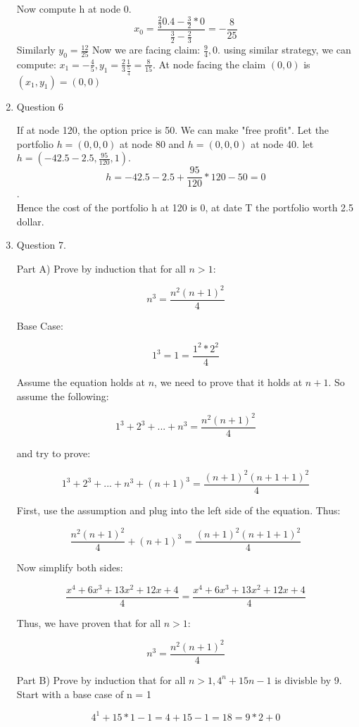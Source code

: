 \documentclass[]{book}
\theoremstyle{definition}
\begin{document}
\begin{enumerate}
Now compute h at node 0.
$$x_0 = \frac{\frac{2}{3}0.4-\frac{3}{2}*0}{\frac{3}{2}-\frac{2}{3}} = -\frac{8}{25}$$
Similarly $y_0 = \frac{12}{25}$
Now we are facing claim: $\frac{9}{4}, 0$. using similar strategy, we can compute: $x_1 = -\frac{4}{5},y_1= \frac{2}{3} \frac{1}{\frac{5}{4}} = \frac{8}{15}$.
At node facing the claim $(0,0)$ is $(x_1,y_1) = (0,0)$











\item Question 6

If at node 120, the option price is 50. We can make "free profit".
Let the portfolio $h =(0,0,0)$ at node 80 and $h=(0,0,0)$ at node 40. let $h=( -42.5 -2.5,\frac{95}{120} , 1)$. 
$$h = -42.5-2.5+\frac{95}{120}*120 - 50 = 0$$.\\
Hence the cost of the portfolio h at 120 is 0, at date T the portfolio worth 2.5 dollar. 
\item Question 7.

Part A) Prove by induction that for all $n>1$:

$$n^3 = \frac{n^2(n+1)^2}{4}$$

Base Case:

$$1^3=1=\frac{1^2*2^2}{4}$$

Assume the equation holds at $n$, we need to prove that it holds at $n+1$. So assume the following:

$$1^3 + 2^3 + ... + n^3 = \frac{n^2(n+1)^2}{4}$$

and try to prove:

$$1^3 + 2^3 + ... + n^3 + (n+1)^3 = \frac{(n+1)^2(n+1+1)^2}{4}$$

First, use the assumption and plug into the left side of the equation. Thus:

$$\frac{n^2(n+1)^2}{4} + (n+1)^3 = \frac{(n+1)^2(n+1+1)^2}{4}$$

Now simplify both sides:

$$\frac{x^4+6x^3+13x^2+12x+4}{4}=\frac{x^4+6x^3+13x^2+12x+4}{4}$$

Thus, we have proven that for all $n>1$:

$$n^3 = \frac{n^2(n+1)^2}{4}$$


Part B) Prove by induction that for all $n>1, 4^n + 15n -1$ is divisble by 9. Start with a base case of n = 1

$$4^1 + 15 * 1 - 1 = 4 + 15 -1 = 18 = 9 * 2 + 0$$


\end{enumerate}
\end{document}
